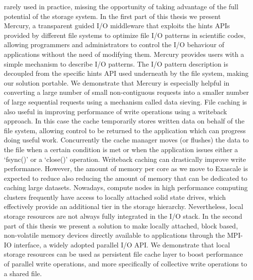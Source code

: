 \documentclass[a4paper,titlepage,oneside,10pt]{book}
\begin{document}
rarely used in practice, missing the opportunity of taking advantage of the full potential of the storage system. 
In the first part of this thesis we present Mercury, a transparent guided I/O middleware that exploits the hints APIs provided by different file systems to optimize file I/O patterns in scientific codes, allowing programmers and 
administrators to control the I/O behaviour of applications without the need of modifying them. Mercury provides users with a simple mechanism to describe I/O patterns. The I/O pattern description is decoupled from the specific
hints API used underneath by the file system, making our solution portable. We demonstrate that Mercury is especially helpful in converting a large number of small non-contiguous requests into a smaller number of large sequential 
requests using a mechanism called data sieving.
File caching is also useful in improving performance of write operations using a writeback approach. In this case the cache temporarily stores written data on behalf of the file system, allowing control to be returned to the 
application which can progress doing useful work. Concurrently the cache manager moves (or flushes) the data to the file when a certain condition is met or when the application issues either a `fsync()' or a `close()' operation.
Writeback caching can drastically improve write performance. However, the amount of memory per core as we move to Exascale is expected to reduce also reducing the amount of memory that can be dedicated to caching large datasets.
Nowadays, compute nodes in high performance computing clusters frequently have access to locally attached solid state drives, which effectively provide an additional tier in the storage hierarchy. Nevertheless, local storage resources 
are not always fully integrated in the I/O stack. In the second part of this thesis we present a solution to make locally attached, block based, non-volatile memory devices directly available to applications through the MPI-IO interface, 
a widely adopted parallel I/O API. We demonstrate that local storage resources can be used as persistent file cache layer to boost performance of parallel write operations, and more specifically of collective write operations to 
a shared file.
\newpage
\end{document}
